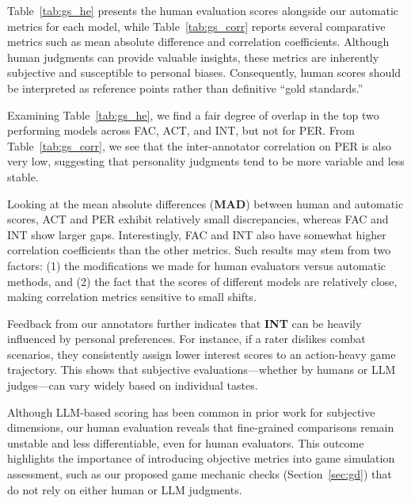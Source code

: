 Table~\ref{tab:gs_he} presents the human evaluation scores alongside our automatic metrics for each model, while Table~\ref{tab:gs_corr} reports several comparative metrics such as mean absolute difference and correlation coefficients. Although human judgments can provide valuable insights, these metrics are inherently subjective and susceptible to personal biases. Consequently, human scores should be interpreted as reference points rather than definitive “gold standards.”

Examining Table~\ref{tab:gs_he}, we find a fair degree of overlap in the top two performing models across FAC, ACT, and INT, but not for PER. From Table~\ref{tab:gs_corr}, we see that the inter-annotator correlation on PER is also very low, suggesting that personality judgments tend to be more variable and less stable.

Looking at the mean absolute differences (\textbf{MAD}) between human and automatic scores, ACT and PER exhibit relatively small discrepancies, whereas FAC and INT show larger gaps. Interestingly, FAC and INT also have somewhat higher correlation coefficients than the other metrics. Such results may stem from two factors: (1) the modifications we made for human evaluators versus automatic methods, and (2) the fact that the scores of different models are relatively close, making correlation metrics sensitive to small shifts.

Feedback from our annotators further indicates that \textbf{INT} can be heavily influenced by personal preferences. For instance, if a rater dislikes combat scenarios, they consistently assign lower interest scores to an action-heavy game trajectory. This shows that subjective evaluations—whether by humans or LLM judges—can vary widely based on individual tastes.

Although LLM-based scoring has been common in prior work for subjective dimensions, our human evaluation reveals that fine-grained comparisons remain unstable and less differentiable, even for human evaluators. This outcome highlights the importance of introducing objective metrics into game simulation assessment, such as our proposed game mechanic checks (Section~\ref{sec:gd}) that do not rely on either human or LLM judgments. 

